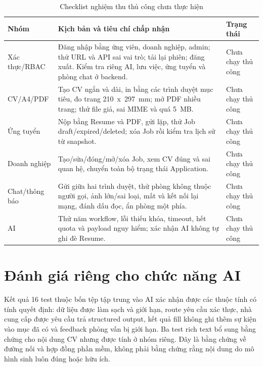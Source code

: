 \begin{table}[H]
    \centering
    \footnotesize
    \begin{tabularx}{\textwidth}{|p{}|Y|p{0.19\textwidth}|} \hline
        \textbf{Nhóm} & \textbf{Kịch bản và tiêu chí chấp nhận} & \textbf{Trạng thái} \\ \hline
        Xác thực/RBAC & Đăng nhập bằng ứng viên, doanh nghiệp, admin; thử URL và API sai vai trò; tải lại phiên; đăng xuất. Kiểm tra riêng AI, lưu việc, ứng tuyển và phòng chat ở backend. & Chưa chạy thủ công \\ \hline
        CV/A4/PDF & Tạo CV ngắn và dài, in bằng các trình duyệt mục tiêu, đo trang 210~x~297~mm; mở PDF nhiều trang; thử file giả, sai MIME và quá 5~MB. & Chưa chạy thủ công \\ \hline
        Ứng tuyển & Nộp bằng Resume và PDF, gửi lặp, thử Job draft/expired/deleted; xóa Job rồi kiểm tra lịch sử từ snapshot. & Chưa chạy thủ công \\ \hline
        Doanh nghiệp & Tạo/sửa/đóng/mở/xóa Job, xem CV đúng và sai quan hệ, chuyển toàn bộ trạng thái Application. & Chưa chạy thủ công \\ \hline
        Chat/thông báo & Gửi giữa hai trình duyệt, thử phòng không thuộc người gọi, ảnh lớn/sai loại, mất và kết nối lại mạng, đánh dấu đọc, ẩn phòng một phía. & Chưa chạy thủ công \\ \hline
        AI & Thử năm workflow, lỗi thiếu khóa, timeout, hết quota và payload nguy hiểm; xác nhận AI không tự ghi đè Resume. & Chưa chạy thủ công \\ \hline
    \end{tabularx}
    \caption{Checklist nghiệm thu thủ công chưa thực hiện}
    \label{tab:manual-checklist}
\end{table}

\section{Đánh giá riêng cho chức năng AI}

Kết quả 16 test thuộc bốn tệp tập trung vào AI xác nhận được các thuộc tính có tính quyết định: dữ liệu được làm sạch và giới hạn, route yêu cầu xác thực, nhà cung cấp được yêu cầu trả structured output, kết quả fill không ghi thêm sự kiện vào mục đã có và feedback phỏng vấn bị giới hạn. Ba test rich text bổ sung bằng chứng cho nội dung CV nhưng được tính ở nhóm riêng. Đây là bằng chứng về đường nối và hợp đồng phần mềm, không phải bằng chứng rằng nội dung do mô hình sinh luôn đúng hoặc hữu ích.

